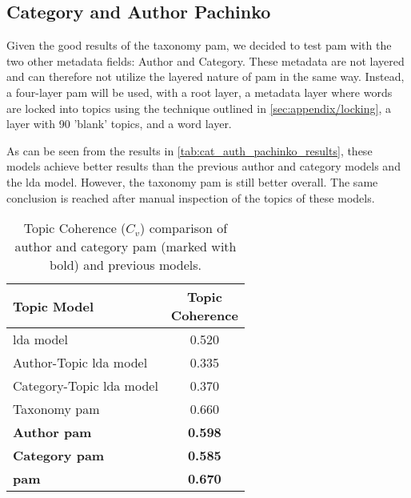 \subsection{Category and Author Pachinko}\label{app:cat_auth_pachinko}
Given the good results of the taxonomy \gls{pam}, we decided to test \gls{pam} with the two other metadata fields: Author and Category.
These metadata are not layered and can therefore not utilize the layered nature of \gls{pam} in the same way.
Instead, a four-layer \gls{pam} will be used, with a root layer, a metadata layer where words are locked into topics using the technique outlined in \autoref{sec:appendix/locking}, a layer with 90 'blank' topics, and a word layer.

As can be seen from the results in \autoref{tab:cat_auth_pachinko_results}, these models achieve better results than the previous author and category models and the \gls{lda} model.
However, the taxonomy \gls{pam} is still better overall.
The same conclusion is reached after manual inspection of the topics of these models.

\begin{table}[h]
	\centering
	\caption{Topic Coherence ($C_v$) comparison of author and category \gls{pam} (marked with bold) and previous models.}
	\begin{tabular}{l|c}
		Topic Model & \makecell{Topic \\ Coherence} \\
		\midrule
		\acrfull{lda} model & 0.520 \\
		Author-Topic \acrlong{lda} model & 0.335 \\
		Category-Topic \acrlong{lda} model & 0.370 \\
		Taxonomy \acrlong{pam} & 0.660 \\
		\textbf{Author \acrlong{pam}} & \textbf{0.598} \\
		\textbf{Category \acrlong{pam}} & \textbf{0.585} \\
		\textbf{\acrlong{pam}} & \textbf{0.670} \\
	\end{tabular}
	\label{tab:cat_auth_pachinko_results}
\end{table}

